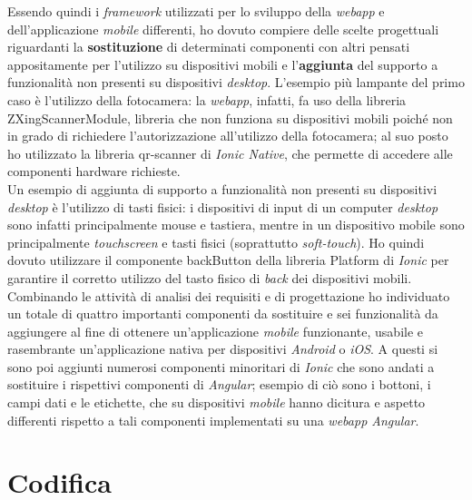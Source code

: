 Essendo quindi i \textit{framework} utilizzati per lo sviluppo della \textit{webapp} e dell'applicazione \textit{mobile} differenti, ho dovuto compiere delle scelte progettuali riguardanti la \textbf{sostituzione} di determinati componenti con altri pensati appositamente per l'utilizzo su dispositivi mobili e l'\textbf{aggiunta} del supporto a funzionalità non presenti su dispositivi \textit{desktop}. L'esempio più lampante del primo caso è l'utilizzo della fotocamera: la \textit{webapp}, infatti, fa uso della libreria ZXingScannerModule, libreria che non funziona su dispositivi mobili poiché non in grado di richiedere l'autorizzazione all'utilizzo della fotocamera; al suo posto ho utilizzato la libreria qr-scanner di \textit{Ionic Native}, che permette di accedere alle componenti hardware richieste. \\
Un esempio di aggiunta di supporto a funzionalità non presenti su dispositivi \textit{desktop} è l'utilizzo di tasti fisici: i dispositivi di input di un computer \textit{desktop} sono infatti principalmente mouse e tastiera, mentre in un dispositivo mobile sono principalmente \textit{touchscreen} e tasti fisici (soprattutto \textit{soft-touch}). Ho quindi dovuto utilizzare il componente backButton della libreria Platform di \textit{Ionic} per garantire il corretto utilizzo del tasto fisico di \textit{back} dei dispositivi mobili. \\
Combinando le attività di analisi dei requisiti e di progettazione ho individuato un totale di quattro importanti componenti da sostituire e sei funzionalità da aggiungere al fine di ottenere un'applicazione \textit{mobile} funzionante, usabile e rasembrante un'applicazione nativa per dispositivi \textit{Android} o \textit{iOS}. A questi si sono poi aggiunti numerosi componenti minoritari di \textit{Ionic} che sono andati a sostituire i rispettivi componenti di \textit{Angular}; esempio di ciò sono i bottoni, i campi dati e le etichette, che su dispositivi \textit{mobile} hanno dicitura e aspetto differenti rispetto a tali componenti implementati su una \textit{webapp Angular}.


\section{Codifica}

